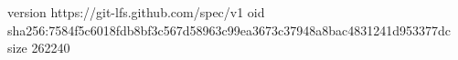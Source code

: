 version https://git-lfs.github.com/spec/v1
oid sha256:7584f5c6018fdb8bf3c567d58963c99ea3673c37948a8bac4831241d953377dc
size 262240
